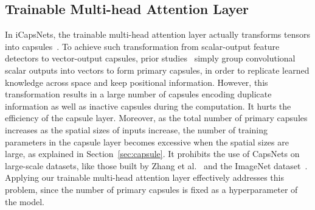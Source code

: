 \documentclass[10pt,journal,compsoc]{IEEEtran}
\begin{document}
\subsection{Trainable Multi-head Attention Layer}\label{sec:attention}

In iCapsNets, the trainable multi-head attention layer actually transforms tensors into capsules~\cite{sabour2017dynamic}. To achieve such transformation from scalar-output feature detectors to vector-output capsules, prior studies~\cite{sabour2017dynamic,xiao2018mcapsnet,yang2018investigating} simply group convolutional scalar outputs into vectors to form primary capsules, in order to replicate learned knowledge across space and keep positional information. However, this transformation results in a large number of capsules encoding duplicate information as well as inactive capsules during the computation. It hurts the efficiency of the capsule layer. Moreover, as the total number of primary capsules increases as the spatial sizes of inputs increase, the number of training parameters in the capsule layer becomes excessive when the spatial sizes are large, as explained in Section~\ref{sec:capsule}. It prohibits the use of CapsNets on large-scale datasets, like those built by Zhang et al.~\cite{zhang2015character} and the ImageNet dataset~\cite{russakovsky2015imagenet}. Applying our trainable multi-head attention layer effectively addresses this problem, since the number of primary capsules is fixed as a hyperparameter of the model.

\end{document}
